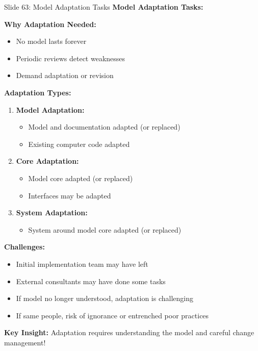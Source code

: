 \documentclass[8pt]{beamer}
\begin{document}
	\begin{frame}{Slide 63: Model Adaptation Tasks}
		\fontsize{6.5}{7.5}\selectfont
		\textbf{Model Adaptation Tasks:}
		
		\vspace{0.1cm}
		\textbf{Why Adaptation Needed:}
		\begin{itemize}
			\item No model lasts forever
			\item Periodic reviews detect weaknesses
			\item Demand adaptation or revision
		\end{itemize}
		
		\vspace{0.1cm}
		\textbf{Adaptation Types:}
		\begin{enumerate}
			\item \textbf{Model Adaptation:}
			\begin{itemize}
				\item Model and documentation adapted (or replaced)
				\item Existing computer code adapted
			\end{itemize}
			\item \textbf{Core Adaptation:}
			\begin{itemize}
				\item Model core adapted (or replaced)
				\item Interfaces may be adapted
			\end{itemize}
			\item \textbf{System Adaptation:}
			\begin{itemize}
				\item System around model core adapted (or replaced)
			\end{itemize}
		\end{enumerate}
		
		\vspace{0.1cm}
		\textbf{Challenges:}
		\begin{itemize}
			\item Initial implementation team may have left
			\item External consultants may have done some tasks
			\item If model no longer understood, adaptation is challenging
			\item If same people, risk of ignorance or entrenched poor practices
		\end{itemize}
		
		\textcolor{myblue}{\textbf{Key Insight:}} Adaptation requires \textcolor{myblue}{understanding the model and careful change management}!
	\end{frame}
	
\end{document}

